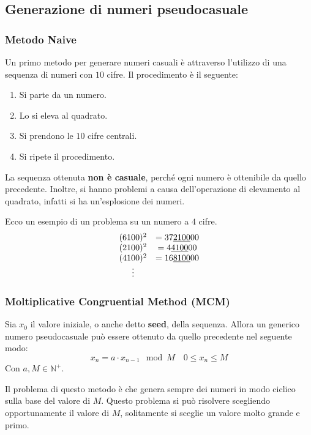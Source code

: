 \subsection{Generazione di numeri pseudocasuale}
\subsubsection{Metodo Naive}
Un primo metodo per generare numeri casuali è attraverso l'utilizzo di una sequenza
di numeri con $10$ cifre. Il procedimento è il seguente:
\begin{enumerate}
    \item Si parte da un numero.
    \item Lo si eleva al quadrato.
    \item Si prendono le $10$ cifre centrali.
    \item Si ripete il procedimento.
\end{enumerate}
La sequenza ottenuta \textbf{non è casuale}, perché ogni numero è ottenibile da
quello precedente. Inoltre, si hanno problemi a causa dell'operazione di elevamento
al quadrato, infatti si ha un'esplosione dei numeri.
\begin{esempio}
    Ecco un esempio di un problema su un numero a $4$ cifre.
    \begin{equation*}
        \begin{array}[pos]{cc}
            (6100)^2 & = 37\underline{2100}00 \\
            (2100)^2 & = 4\underline{4100}00  \\
            (4100)^2 & = 16\underline{8100}00 \\
            \vdots
        \end{array}
    \end{equation*}
\end{esempio}
\subsubsection{Moltiplicative Congruential Method (MCM)}
Sia $x_0$ il valore iniziale, o anche detto \textbf{seed}, della sequenza. Allora
un generico numero pseudocasuale può essere ottenuto da quello precedente nel
seguente modo:
\begin{equation}
    x_n = a \cdot x_{n-1} \mod M \quad 0 \leq x_n \leq M
\end{equation}
Con $a, M \in \mathbb{N}^+$.

Il problema di questo metodo è che genera sempre dei numeri in modo ciclico sulla
base del valore di $M$. Questo problema si può risolvere scegliendo opportunamente
il valore di $M$, solitamente si sceglie un valore molto grande e primo.
